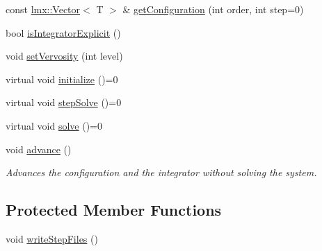 \begin{DoxyCompactItemize}
\item 
const \hyperlink{classlmx_1_1Vector}{lmx\-::\-Vector}$<$ T $>$ \& \hyperlink{classlmx_1_1DiffProblem_a30189df0b3fb21bb133ae3f8605960ed}{get\-Configuration} (int order, int step=0)
\item 
bool \hyperlink{classlmx_1_1DiffProblem_a75a92da3686aa6b8807ad68eb79a86ea}{is\-Integrator\-Explicit} ()
\item 
void \hyperlink{classlmx_1_1DiffProblem_a0a3a2b2a3439c317381ab2248113b6e5}{set\-Vervosity} (int level)
\item 
virtual void \hyperlink{classlmx_1_1DiffProblem_a63b0e232de28374afb9bb3b1389f689a}{initialize} ()=0
\item 
virtual void \hyperlink{classlmx_1_1DiffProblem_a81e9c22909edbe06b00210c6b2caac58}{step\-Solve} ()=0
\item 
virtual void \hyperlink{classlmx_1_1DiffProblem_a287dc44a62a249feb8855bd10098ecac}{solve} ()=0
\item 
void \hyperlink{classlmx_1_1DiffProblem_a456e836c8dd468f6b02def753d14218a}{advance} ()
\begin{DoxyCompactList}\small\item\em Advances the configuration and the integrator without solving the system. \end{DoxyCompactList}\end{DoxyCompactItemize}
\subsection*{Protected Member Functions}
\begin{DoxyCompactItemize}
\item 
void \hyperlink{classlmx_1_1DiffProblem_a14bc11e5167b425f1a94de4d73c934ec}{write\-Step\-Files} ()
\end{DoxyCompactItemize}
